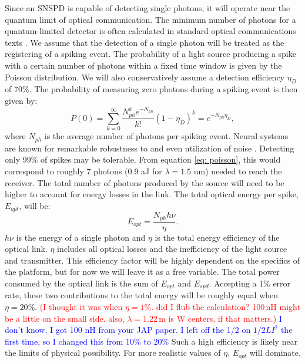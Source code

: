 \documentclass[twocolumn]{article}
\begin{document}
Since an SNSPD is capable of detecting single photons, it will operate near the quantum limit of optical communication. The minimum number of photons for a quantum-limited detector is often calculated in standard optical communications texts \cite{razavi2012design}. We assume that the detection of a single photon will be treated as the registering of a spiking event. The probability of a light source producing a spike with a certain number of photons within a fixed time window is given by the Poisson distribution. We will also conservatively assume a detection efficiency $\eta_D$ of 70\%. The probability of measuring zero photons during a spiking event is then given by:
\begin{equation}
    P(0) = \sum_{k=0}^{\infty} \frac{N_{ph}^k e^{-N_{ph}}}{k!}(1-\eta_D)^{k} = e^{-N_{ph}\eta_D},
\label{eq: poisson}
\end{equation}
where $N_{ph}$ is the average number of photons per spiking event. Neural systems are known for remarkable robustness to and even utilization of noise \cite{stein2005neuronal, mcdonnell2011benefits}. Detecting only 99\% of spikes may be tolerable. From equation \ref{eq: poisson}, this would correspond to roughly 7 photons (0.9 aJ for $\lambda = 1.5$ um) needed to reach the receiver. The total number of photons produced by the source will need to be higher to account for energy losses in the link. The total optical energy per spike, $E_{opt}$, will be:
\begin{equation}
    E_{opt} = \frac{N_{ph} h \nu}{\eta}.
\end{equation}
$h\nu$ is the energy of a single photon and $\eta$ is the total energy efficiency of the optical link. $\eta$ includes all optical losses and the inefficiency of the light source and transmitter. This efficiency factor will be highly dependent on the specifics of the platform, but for now we will leave it as a free variable. The total power consumed by the optical link is the sum of $E_{opt}$ and $E_{spd}$. Accepting a 1\% error rate, these two contributions to the total energy will be roughly equal when $\eta = 20\%$. \textcolor{red}{(I thought it was when $\eta = 1\%$. did I flub the calculation? 100\,nH might be a little on the small side. also, $\lambda = 1.22$\,\textmu m is W centers, if that matters.)} \textcolor{blue}{I don't know, I got 100 nH from your JAP paper. I left off the 1/2 on $1/2 L I^2$ the first time, so I changed this from 10\% to 20\%} Such a high efficiency is likely near the limits of physical possibility. For more realistic values of $\eta$, $E_{opt}$ will dominate.
\end{document}
